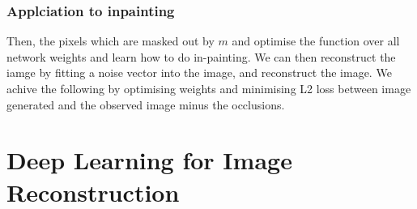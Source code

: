 \documentclass[11pt]{article}
\begin{document}
\subsubsection{Applciation to inpainting}

\begin{figure}[H]
    \centering
\end{figure}

Then, the pixels which are masked out by $m$ and optimise the function over all network weights and learn how to do in-painting. We can then reconstruct the iamge by fitting a noise vector into the image, and reconstruct the image. We achive the following by optimising weights and minimising L2 loss between image generated and the observed image minus the occlusions.

\section{Deep Learning for Image Reconstruction}

\begin{minipage}[l]{.5\linewidth}
    \begin{figure}[H]
        \centering
    \end{figure}    
\end{minipage}\hfill
\begin{minipage}[r]{.48\linewidth}

\end{minipage}

\begin{minipage}[l]{.5\linewidth}
    \begin{figure}[H]
        \centering
    \end{figure}    
\end{minipage}\hfill
\begin{minipage}[r]{.48\linewidth}

\end{minipage}

\begin{minipage}[l]{.5\linewidth}
    \begin{figure}[H]
        \centering
    \end{figure}    
\end{minipage}\hfill
\begin{minipage}[r]{.48\linewidth}

\end{minipage}
\end{document}
